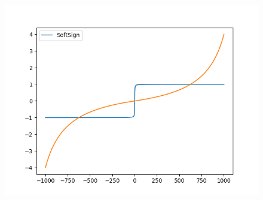 \documentclass[a4paper,12pt]{article}
\begin{document}
\begin{figure}[h!]
\includegraphics[width = .9\linewidth]{Figure_1}
\end{figure}
\end{document}
